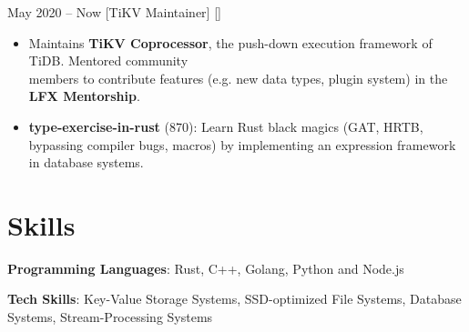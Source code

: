 \documentclass{chicv}
\begin{document}
    {May 2020 -- Now}
    [TiKV Maintainer]
    [] %
    \begin{itemize}
      \item Maintains \textbf{TiKV Coprocessor}, the push-down execution framework of TiDB. Mentored community\\ members to contribute features (e.g. new data types, plugin system) in the \textbf{LFX Mentorship}. \ 
    \end{itemize}

\begin{itemize}
  \item \textbf{type-exercise-in-rust} (870):
  {\small Learn Rust black magics (GAT, HRTB, bypassing compiler bugs, macros) by implementing an expression framework in database systems.}
\end{itemize}


\section{Skills}

\begin{compactlist}
  \item \textbf{Programming Languages}: Rust, C++, Golang, Python and Node.js
  \item \textbf{Tech Skills}: Key-Value Storage Systems, SSD-optimized File Systems, Database Systems, Stream-Processing Systems
\end{compactlist}
\end{document}
